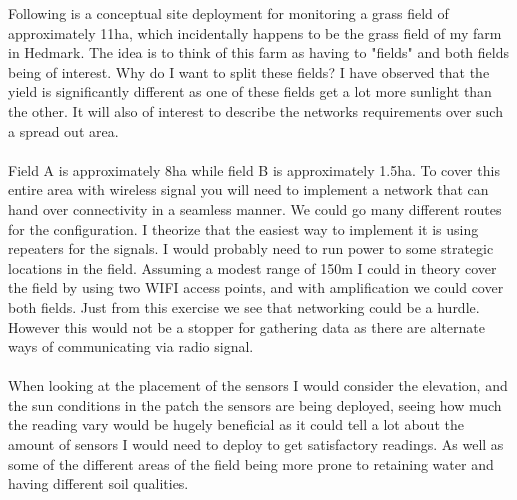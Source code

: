\documentclass[]{uiophd}
\begin{document}
 Following is a conceptual site deployment for monitoring a grass field of approximately 11ha, which incidentally happens to be the grass field of my farm in Hedmark. The idea is to think of this farm as having to "fields" and both fields being of interest. Why do I want to split these fields? I have observed that the yield is significantly different as one of these fields get a lot more sunlight than the other. It will also of interest to describe the networks requirements over such a spread out area.
 \\\\
 Field A is approximately 8ha while field B is approximately 1.5ha. To cover this entire area with wireless signal you will need to implement a network that can hand over connectivity in a seamless manner. We could go many different routes for the configuration. I theorize that the easiest way to implement it is using repeaters for the signals. I would probably need to run power to some strategic locations in the field. Assuming a modest range of 150m I could in theory cover the field by using two WIFI access points, and with amplification we could cover both fields. Just from this exercise we see that networking could be a hurdle. However this would not be a stopper for gathering data as there are alternate ways of communicating via radio signal.
 \\\\
 When looking at the placement of the sensors I would consider the elevation, and the sun conditions in the patch the sensors are being deployed, seeing how much the reading vary would be hugely beneficial as it could tell a lot about the amount of sensors I would need to deploy to get satisfactory readings. As well as some of the different areas of the field being more prone to retaining water and having different soil qualities. 
 
\end{document}
